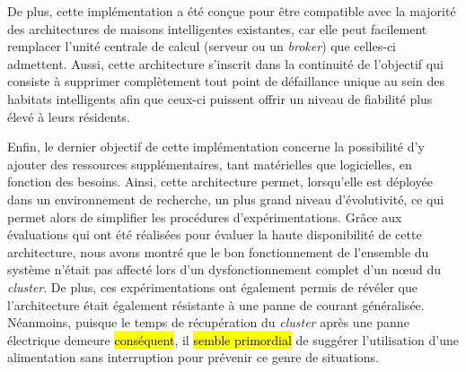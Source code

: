 De plus, cette implémentation a été conçue pour être compatible avec la majorité des architectures de maisons intelligentes existantes, car elle peut facilement remplacer l'unité centrale de calcul (serveur ou un \textit{broker}) que celles-ci admettent. Aussi, cette architecture s'inscrit dans la continuité de l'objectif qui consiste à supprimer complètement tout point de défaillance unique au sein des habitats intelligents afin que ceux-ci puissent offrir un niveau de fiabilité plus élevé à leurs résidents.

Enfin, le dernier objectif de cette implémentation concerne la possibilité d'y ajouter des ressources supplémentaires, tant matérielles que logicielles, en fonction des besoins. Ainsi, cette architecture permet, lorsqu'elle est déployée dans un environnement de recherche, un plus grand niveau d'évolutivité, ce qui permet alors de simplifier les procédures d'expérimentations. Grâce aux évaluations qui ont été réalisées pour évaluer la haute disponibilité de cette architecture, nous avons montré que le bon fonctionnement de l'ensemble du système n'était pas affecté lors d'un dysfonctionnement complet d'un n\oe{}ud du \textit{cluster}. De plus, ces expérimentations ont également permis de révéler que l'architecture était également résistante à une panne de courant généralisée. Néanmoins, puisque le temps de récupération du \textit{cluster} après une panne électrique demeure \hl{conséquent}, il \hl{semble primordial} de suggérer l'utilisation d'une alimentation sans interruption pour prévenir ce genre de situations.
